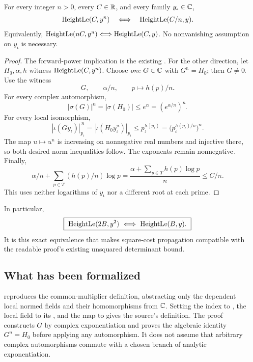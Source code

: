 \begin{theorem}
\label{thm:root}
For every integer \(n>0\), every \(C\in\mathbb R\), and every family
\(y_\iota\in\mathbb C\),
\[
 \operatorname{HeightLe}(C,y^n)\quad\Longleftrightarrow\quad
 \operatorname{HeightLe}(C/n,y).
\]
Equivalently, \(\operatorname{HeightLe}(nC,y^n)\Longleftrightarrow\operatorname{HeightLe}(C,y)\).
No nonvanishing assumption on \(y_\iota\) is necessary.
\end{theorem}

\begin{proof}
The forward-power implication is the existing .
For the other direction, let \(H_0,\alpha,h\) witness \(\operatorname{HeightLe}(C,y^n)\).
Choose \emph{one} \(G\in\mathbb C\) with \(G^n=H_0\); then \(G\ne0\).
Use the witness
\[
 G,\qquad \alpha/n,\qquad p\longmapsto h(p)/n.
\]
For every complex automorphism,
\[
 |\sigma(G)|^n=|\sigma(H_0)|
       \le e^\alpha=(e^{\alpha/n})^n.
\]
For every local isomorphism,
\[
 |\iota(Gy_\iota)|_{p_\iota}^{\,n}
 =|\iota(H_0y_\iota^n)|_{p_\iota}
 \le p_\iota^{h(p_\iota)}
 =\bigl(p_\iota^{h(p_\iota)/n}\bigr)^n.
\]
The map \(u\mapsto u^n\) is increasing on nonnegative real numbers and
injective there, so both desired norm inequalities follow. The exponents
remain nonnegative. Finally,
\[
 \alpha/n+\sum_{p\in T}(h(p)/n)\log p
 =\frac{\alpha+\sum_{p\in T}h(p)\log p}{n}\le C/n.
\]
This uses neither logarithms of \(y_\iota\) nor a different root at each prime.
\end{proof}

In particular,
\begin{equation}
 \boxed{\ \HLe(2B,y^2)\ \Longleftrightarrow\ \HLe(B,y).\ }
 \label{eq:square}
\end{equation}
It is this exact equivalence that makes square-cost propagation compatible
with the readable proof's existing unsquared determinant bound.

\subsection{What has been formalized}

 reproduces the common-multiplier definition,
abstracting only the dependent local normed fields and their homomorphisms
from \(\mathbb C\). Setting the index to , the local field
to its , and the map to  gives the
source's definition. The proof constructs \(G\) by complex exponentiation
and proves the algebraic identity \(G^n=H_0\) before applying any
automorphism. It does not assume that arbitrary complex automorphisms
commute with a chosen branch of analytic exponentiation.

